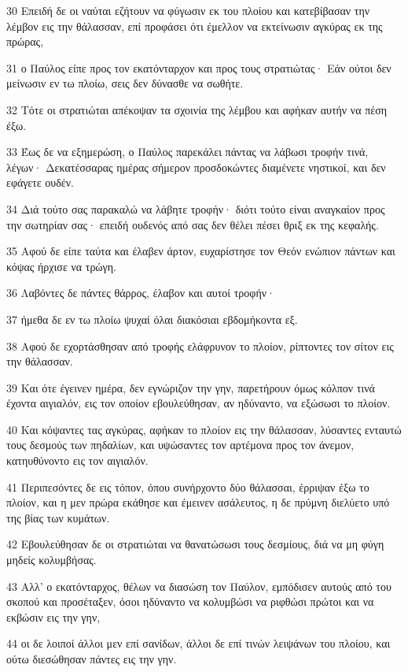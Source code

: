 \par 30 Επειδή δε οι ναύται εζήτουν να φύγωσιν εκ του πλοίου και κατεβίβασαν την λέμβον εις την θάλασσαν, επί προφάσει ότι έμελλον να εκτείνωσιν αγκύρας εκ της πρώρας,
\par 31 ο Παύλος είπε προς τον εκατόνταρχον και προς τους στρατιώτας· Εάν ούτοι δεν μείνωσιν εν τω πλοίω, σεις δεν δύνασθε να σωθήτε.
\par 32 Τότε οι στρατιώται απέκοψαν τα σχοινία της λέμβου και αφήκαν αυτήν να πέση έξω.
\par 33 Έως δε να εξημερώση, ο Παύλος παρεκάλει πάντας να λάβωσι τροφήν τινά, λέγων· Δεκατέσσαρας ημέρας σήμερον προσδοκώντες διαμένετε νηστικοί, και δεν εφάγετε ουδέν.
\par 34 Διά τούτο σας παρακαλώ να λάβητε τροφήν· διότι τούτο είναι αναγκαίον προς την σωτηρίαν σας· επειδή ουδενός από σας δεν θέλει πέσει θριξ εκ της κεφαλής.
\par 35 Αφού δε είπε ταύτα και έλαβεν άρτον, ευχαρίστησε τον Θεόν ενώπιον πάντων και κόψας ήρχισε να τρώγη.
\par 36 Λαβόντες δε πάντες θάρρος, έλαβον και αυτοί τροφήν·
\par 37 ήμεθα δε εν τω πλοίω ψυχαί όλαι διακόσιαι εβδομήκοντα εξ.
\par 38 Αφού δε εχορτάσθησαν από τροφής ελάφρυνον το πλοίον, ρίπτοντες τον σίτον εις την θάλασσαν.
\par 39 Και ότε έγεινεν ημέρα, δεν εγνώριζον την γην, παρετήρουν όμως κόλπον τινά έχοντα αιγιαλόν, εις τον οποίον εβουλεύθησαν, αν ηδύναντο, να εξώσωσι το πλοίον.
\par 40 Και κόψαντες τας αγκύρας, αφήκαν το πλοίον εις την θάλασσαν, λύσαντες ενταυτώ τους δεσμούς των πηδαλίων, και υψώσαντες τον αρτέμονα προς τον άνεμον, κατηυθύνοντο εις τον αιγιαλόν.
\par 41 Περιπεσόντες δε εις τόπον, όπου συνήρχοντο δύο θάλασσαι, έρριψαν έξω το πλοίον, και η μεν πρώρα εκάθησε και έμεινεν ασάλευτος, η δε πρύμνη διελύετο υπό της βίας των κυμάτων.
\par 42 Εβουλεύθησαν δε οι στρατιώται να θανατώσωσι τους δεσμίους, διά να μη φύγη μηδείς κολυμβήσας.
\par 43 Αλλ' ο εκατόνταρχος, θέλων να διασώση τον Παύλον, εμπόδισεν αυτούς από του σκοπού και προσέταξεν, όσοι ηδύναντο να κολυμβώσι να ριφθώσι πρώτοι και να εκβώσιν εις την γην,
\par 44 οι δε λοιποί άλλοι μεν επί σανίδων, άλλοι δε επί τινών λειψάνων του πλοίου, και ούτω διεσώθησαν πάντες εις την γην.

